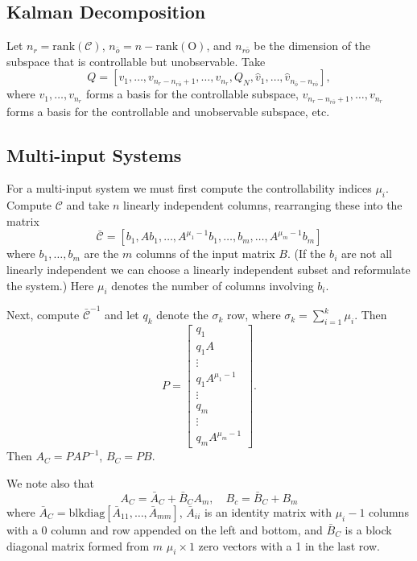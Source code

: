 \documentclass{article}
\begin{document}
\subsection{Kalman Decomposition}

Let $n_r = \mathrm{rank}(\mathcal{C})$,
$n_{\bar{o}} = n - \mathrm{rank}(\mathrm{O})$, and $n_{r\bar{o}}$ be the dimension
of the subspace that is controllable but unobservable. Take
$$
Q = [v_1, \dots, v_{n_r - n_{r\bar{o}} + 1}, \dots, v_{n_r}, Q_N,
     \hat{v}_1, \dots, \hat{v}_{n_{\bar{o}} - n_{r \bar{o}}}],
$$
where $v_1, \dots, v_{n_r}$ forms a basis for the controllable subspace,
$v_{n_r - n_{r\bar{o}} + 1}, \dots, v_{n_r}$ forms a basis for the
controllable and unobservable subspace, etc. %

\subsection{Multi-input Systems}
For a multi-input system we must first compute the controllability
indices $\mu_i$. Compute $\mathcal{C}$ and take $n$ linearly independent
columns, rearranging these into the matrix
$$
\bar{\mathcal{C}} =
\left[
  b_1, A b_1, \dots, A^{\mu_1 - 1} b_1,
  \dots,
  b_m, \dots, A^{\mu_m - 1} b_m
\right]
$$
where $b_1, \dots, b_m$ are the $m$ columns of the input matrix $B$.
(If the $b_i$ are not all linearly independent we can choose a
linearly independent subset and reformulate the system.)
Here $\mu_i$ denotes the number of columns involving $b_i$.

Next, compute $\bar{\mathcal{C}}^{-1}$ and let $q_k$ denote the $\sigma_k$
row, where $\sigma_k = \sum_{i=1}^k \mu_i$. Then
$$
P =
\left[\begin{array}{c}
  q_1            \\
  q_1 A          \\
  \vdots         \\
  q_1 A^{\mu_1 - 1} \\
  \vdots         \\
  q_m            \\
  \vdots         \\
  q_m A^{\mu_m - 1}
\end{array}\right].
$$
Then $A_C = P A P^{-1}$, $B_C = P B$.

We note also that
$$
A_C = \bar{A}_C + \bar{B}_C A_m, \quad
B_c = \bar{B}_C + B_m
$$
where $\bar{A}_C = \mathrm{blkdiag}[\bar{A}_{11}, \dots,
\bar{A}_{mm}]$, $\bar{A}_{ii}$ is an identity matrix with $\mu_i - 1$
columns with a 0 column and row appended on the left and bottom, and
$\bar{B}_C$ is a block diagonal matrix formed from $m$ $\mu_i \times 1$
zero vectors with a 1 in the last row.
\end{document}
